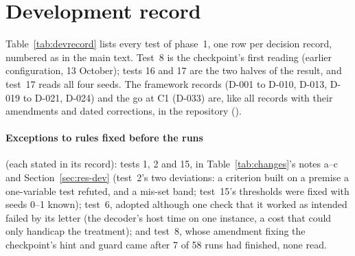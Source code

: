 \section{Development record}\label{app:devrecord}
Table~\ref{tab:devrecord} lists every test of phase~1, one row per decision record, numbered as in the main text.
Test~8 is the checkpoint's first reading (earlier configuration, 13 October); tests 16 and 17 are the two halves of
the result, and test~17 reads all four seeds. The framework records (D-001 to D-010,
D-013, D-019 to D-021, D-024) and the go at C1 (D-033) are, like all records with their amendments and dated
corrections, in the repository ().


\paragraph{Exceptions to rules fixed before the runs} (each stated in its record): tests 1, 2 and 15, in
Table~\ref{tab:changes}'s notes a--c and Section~\ref{sec:res-dev} (test~2's two deviations: a criterion built on a
premise a one-variable test refuted, and a mis-set band; test~15's thresholds were fixed with seeds 0--1 known);
test~6, adopted although one check that it worked as intended failed by its letter (the decoder's host time on one
instance, a cost that could only handicap the treatment); and test~8, whose amendment fixing the checkpoint's hint and
guard came after 7 of 58 runs had finished, none read.
